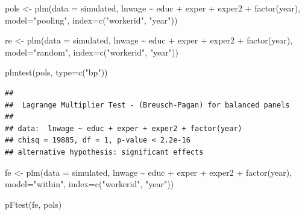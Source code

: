 \documentclass[
]{article}
\newenvironment{Shaded}{\begin{snugshade}}{\end{snugshade}}
\newcommand{\AttributeTok}[1]{\textcolor[rgb]{0.77,0.63,0.00}{#1}}
\newcommand{\FunctionTok}[1]{\textcolor[rgb]{0.00,0.00,0.00}{#1}}
\newcommand{\NormalTok}[1]{#1}
\newcommand{\OtherTok}[1]{\textcolor[rgb]{0.56,0.35,0.01}{#1}}
\newcommand{\SpecialCharTok}[1]{\textcolor[rgb]{0.00,0.00,0.00}{#1}}
\newcommand{\StringTok}[1]{\textcolor[rgb]{0.31,0.60,0.02}{#1}}
\begin{document}
\begin{Shaded}
\begin{Highlighting}[]
\NormalTok{  pols }\OtherTok{\textless{}{-}} \FunctionTok{plm}\NormalTok{(}\AttributeTok{data =}\NormalTok{ simulated, lnwage }\SpecialCharTok{\textasciitilde{}}\NormalTok{ educ }\SpecialCharTok{+}\NormalTok{ exper }\SpecialCharTok{+} 
\NormalTok{              exper2 }\SpecialCharTok{+} \FunctionTok{factor}\NormalTok{(year), }
            \AttributeTok{model=}\StringTok{"pooling"}\NormalTok{, }\AttributeTok{index=}\FunctionTok{c}\NormalTok{(}\StringTok{"workerid"}\NormalTok{, }\StringTok{"year"}\NormalTok{))}

\NormalTok{  re }\OtherTok{\textless{}{-}} \FunctionTok{plm}\NormalTok{(}\AttributeTok{data =}\NormalTok{ simulated, lnwage }\SpecialCharTok{\textasciitilde{}}\NormalTok{ educ }\SpecialCharTok{+}\NormalTok{ exper }\SpecialCharTok{+} 
\NormalTok{            exper2 }\SpecialCharTok{+} \FunctionTok{factor}\NormalTok{(year), }
          \AttributeTok{model=}\StringTok{"random"}\NormalTok{, }\AttributeTok{index=}\FunctionTok{c}\NormalTok{(}\StringTok{"workerid"}\NormalTok{, }\StringTok{"year"}\NormalTok{))}

  \FunctionTok{plmtest}\NormalTok{(pols, }\AttributeTok{type=}\FunctionTok{c}\NormalTok{(}\StringTok{"bp"}\NormalTok{))}
\end{Highlighting}
\end{Shaded}

\begin{verbatim}
## 
##  Lagrange Multiplier Test - (Breusch-Pagan) for balanced panels
## 
## data:  lnwage ~ educ + exper + exper2 + factor(year)
## chisq = 19885, df = 1, p-value < 2.2e-16
## alternative hypothesis: significant effects
\end{verbatim}

\begin{Shaded}
\begin{Highlighting}[]
\NormalTok{  fe }\OtherTok{\textless{}{-}} \FunctionTok{plm}\NormalTok{(}\AttributeTok{data =}\NormalTok{ simulated, lnwage }\SpecialCharTok{\textasciitilde{}}\NormalTok{ educ }\SpecialCharTok{+}\NormalTok{ exper }\SpecialCharTok{+} 
\NormalTok{              exper2 }\SpecialCharTok{+} \FunctionTok{factor}\NormalTok{(year), }
            \AttributeTok{model=}\StringTok{"within"}\NormalTok{, }\AttributeTok{index=}\FunctionTok{c}\NormalTok{(}\StringTok{"workerid"}\NormalTok{, }\StringTok{"year"}\NormalTok{))}
  
  \FunctionTok{pFtest}\NormalTok{(fe, pols)}
\end{Highlighting}
\end{Shaded}
\end{document}
